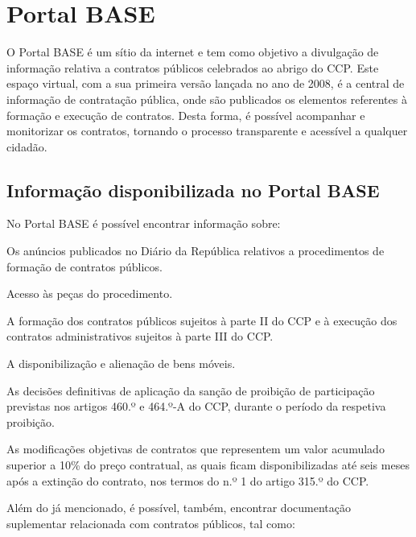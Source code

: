 \section{Portal BASE}

O Portal BASE  é um sítio da internet e tem como objetivo a divulgação de informação relativa a contratos públicos celebrados ao abrigo do CCP.
Este espaço virtual, com a sua primeira versão lançada no ano de 2008, é a central de informação de contratação pública, onde são publicados os elementos referentes à formação e execução de contratos. 
Desta forma, é possível acompanhar e monitorizar os contratos, tornando o processo transparente e acessível a qualquer cidadão. 

%



\subsection{Informação disponibilizada no Portal BASE}

No Portal BASE é possível encontrar informação sobre:

\begin{my_enumerate}
	\item Os anúncios publicados no Diário da República relativos a procedimentos de formação de contratos públicos.
	\item Acesso às peças do procedimento.
	\item A formação dos contratos públicos sujeitos à parte II do CCP e à execução dos contratos administrativos sujeitos à parte III do CCP.
	\item A disponibilização e alienação de bens móveis.
	\item As decisões definitivas de aplicação da sanção de proibição de participação previstas nos artigos 460.º e 464.º-A do CCP, durante o período da respetiva proibição.
	\item As modificações objetivas de contratos que representem um valor acumulado superior a 10\% do preço contratual, as quais ficam disponibilizadas até seis meses após a extinção do contrato, nos termos do n.º 1 do artigo 315.º do CCP.
\end{my_enumerate}



Além do já mencionado, é possível, também, encontrar documentação suplementar relacionada com contratos públicos, tal como:

